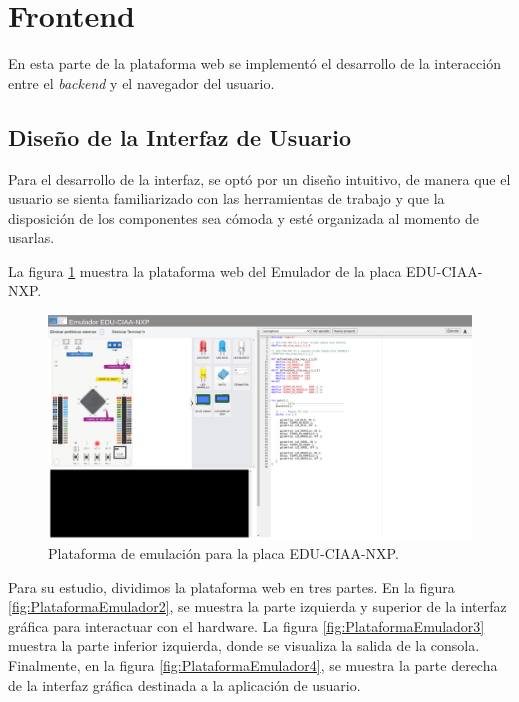 \section{Frontend}
En esta parte de la plataforma web se implementó el desarrollo de la interacción entre el \textit{backend} y el navegador del usuario.


\subsection{Diseño de la Interfaz de Usuario}

Para el desarrollo de la interfaz, se optó por un diseño intuitivo, de manera que el usuario se sienta familiarizado con las herramientas de trabajo y que la disposición de los componentes sea cómoda y esté organizada al momento de usarlas.

La figura \ref{fig:PlataformaEmulador1} muestra la plataforma web del Emulador de la placa EDU-CIAA-NXP.

\begin{figure}[ht]
	\centering
	\includegraphics[scale=.27]{./Figures/PlataformaEmulador.png}
	\caption{Plataforma de emulación para la placa EDU-CIAA-NXP.}
	\label{fig:PlataformaEmulador1}
\end{figure}


Para su estudio, dividimos la plataforma web en tres partes. En la figura \ref{fig:PlataformaEmulador2}, se muestra la parte izquierda y superior de la interfaz gráfica para interactuar con el hardware. La figura \ref{fig:PlataformaEmulador3} muestra la parte inferior izquierda, donde se visualiza la salida de la consola. Finalmente, en la figura \ref{fig:PlataformaEmulador4}, se muestra la parte derecha de la interfaz gráfica destinada a la aplicación de usuario.

